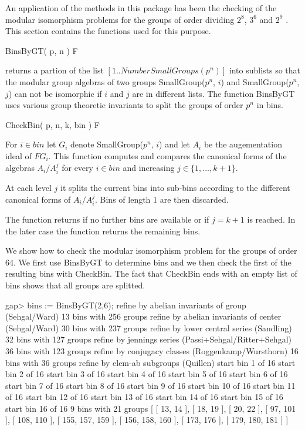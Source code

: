 
An application of the methods in this package has been the checking
of the modular isomorphism problems for the groups of order dividing
$2^8$, $3^6$ and $2^9$ \cite{Eic07,EKo10}. This section contains the 
functions used for this purpose. 


\> BinsByGT( p, n ) F

returns a partion of the list $[1..NumberSmallGroups(p^n)]$ into 
sublists so that the modular group algebras of two groups 
SmallGroup($p^n$, $i$) and SmallGroup($p^n$, $j$) can not be
isomorphic if $i$ and $j$ are in different lists. The function
BinsByGT uses various group theoretic invariants to split the
groups of order $p^n$ in bins.

\> CheckBin( p, n, k, bin ) F

For $i \in bin$ let $G_i$ denote SmallGroup($p^n$, $i$) and let $A_i$
be the augementation ideal of $F G_i$. This function computes and
compares the canonical forms of the algebras $A_i / A_i^j$ for every
$i \in bin$ and increasing $j \in \{1, \ldots, k+1\}$. 

At each level $j$ it splits the current bins into sub-bins according 
to the different canonical forms of $A_i/A_i^j$. Bins of length 1 are 
then discarded.

The function returns if no further bins are available or if $j=k+1$ is
reached. In the later case the function returns the remaining bins. 


We show how to check the modular isomorphism problem for the groups
of order 64. We first use BinsByGT to determine bins and we then check
the first of the resulting bins with CheckBin. The fact that CheckBin
ends with an empty list of bins shows that all groups are splitted.

\beginexample
gap> bins := BinsByGT(2,6);
refine by abelian invariants of group (Sehgal/Ward) 
13 bins with 256 groups 
refine by abelian invariants of center (Sehgal/Ward) 
30 bins with 237 groups 
refine by lower central series (Sandling) 
32 bins with 127 groups 
refine by jennings series (Passi+Sehgal/Ritter+Sehgal) 
36 bins with 123 groups 
refine by conjugacy classes (Roggenkamp/Wursthorn) 
16 bins with 36 groups 
refine by elem-ab subgroups (Quillen) 
  start bin 1 of 16
  start bin 2 of 16
  start bin 3 of 16
  start bin 4 of 16
  start bin 5 of 16
  start bin 6 of 16
  start bin 7 of 16
  start bin 8 of 16
  start bin 9 of 16
  start bin 10 of 16
  start bin 11 of 16
  start bin 12 of 16
  start bin 13 of 16
  start bin 14 of 16
  start bin 15 of 16
  start bin 16 of 16
9 bins with 21 groups 
[ [ 13, 14 ], [ 18, 19 ], [ 20, 22 ], [ 97, 101 ], [ 108, 110 ], 
  [ 155, 157, 159 ], [ 156, 158, 160 ], [ 173, 176 ], [ 179, 180, 181 ] ]

